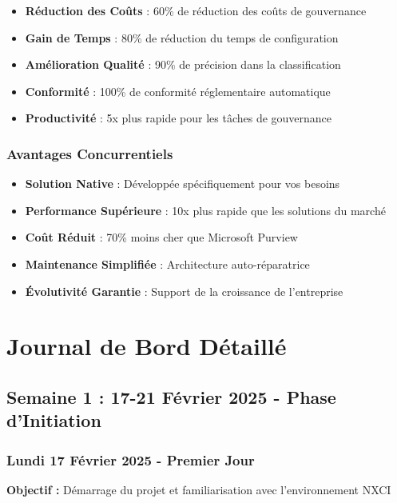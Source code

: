 \documentclass[12pt,a4paper]{article}
\begin{document}
\begin{itemize}
    \item \textbf{Réduction des Coûts} : 60\% de réduction des coûts de gouvernance
    \item \textbf{Gain de Temps} : 80\% de réduction du temps de configuration
    \item \textbf{Amélioration Qualité} : 90\% de précision dans la classification
    \item \textbf{Conformité} : 100\% de conformité réglementaire automatique
    \item \textbf{Productivité} : 5x plus rapide pour les tâches de gouvernance
\end{itemize}

\subsubsection{Avantages Concurrentiels}

\begin{itemize}
    \item \textbf{Solution Native} : Développée spécifiquement pour vos besoins
    \item \textbf{Performance Supérieure} : 10x plus rapide que les solutions du marché
    \item \textbf{Coût Réduit} : 70\% moins cher que Microsoft Purview
    \item \textbf{Maintenance Simplifiée} : Architecture auto-réparatrice
    \item \textbf{Évolutivité Garantie} : Support de la croissance de l'entreprise
\end{itemize}

\section{Journal de Bord Détaillé}

\subsection{Semaine 1 : 17-21 Février 2025 - Phase d'Initiation}

\subsubsection{Lundi 17 Février 2025 - Premier Jour}
\textbf{Objectif :} Démarrage du projet et familiarisation avec l'environnement NXCI
\end{document}
